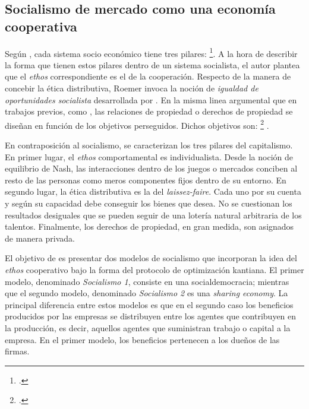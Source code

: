 \subsection{Socialismo de mercado como una economía cooperativa}

Según \citet[p. 572]{Roemer_2021a}, cada sistema socio económico tiene tres pilares: \footnote{ \citep[p. 572]{Roemer_2021a}.}. A la hora de describir la forma que tienen estos pilares dentro de un sistema socialista, el autor plantea que el \textit{ethos} correspondiente es el de la cooperación. Respecto de la manera de concebir la ética distributiva, Roemer invoca la noción de \textit{igualdad de oportunidades socialista} desarrollada por \citet{Cohen_2014c}. En la misma linea argumental que en trabajos previos, como \citet{Roemer_1994}, las relaciones de propiedad o derechos de propiedad se diseñan en función de los objetivos perseguidos. Dichos objetivos son: \footnote{ \citep[p. 572-573]{Roemer_2021a}.} \citep[p. 572-573]{Roemer_2021a}.

En contraposición al socialismo, se caracterizan los tres pilares del capitalismo. En primer lugar, el \textit{ethos} comportamental es individualista. Desde la noción de equilibrio de Nash, las interacciones dentro de los juegos o mercados conciben al resto de las personas como meros componentes fijos dentro de su entorno. En segundo lugar, la ética distributiva es la del \textit{laissez-faire}. Cada uno por su cuenta y según su capacidad debe conseguir los bienes que desea. No se cuestionan los resultados desiguales que se pueden seguir de una lotería natural arbitraria de los talentos. Finalmente, los derechos de propiedad, en gran medida, son asignados de manera privada.

El objetivo de \citet{Roemer_2021a} es presentar dos modelos de socialismo que incorporan la idea del \textit{ethos} cooperativo bajo la forma del protocolo de optimización kantiana. El primer modelo, denominado \textit{Socialismo 1}, consiste en una socialdemocracia; mientras que el segundo modelo, denominado \textit{Socialismo 2} es una \textit{sharing economy}. La principal diferencia entre estos modelos es que en el segundo caso los beneficios producidos por las empresas se distribuyen entre los agentes que contribuyen en la producción, es decir, aquellos agentes que suministran trabajo o capital a la empresa. En el primer modelo, los beneficios pertenecen a los dueños de las firmas.


